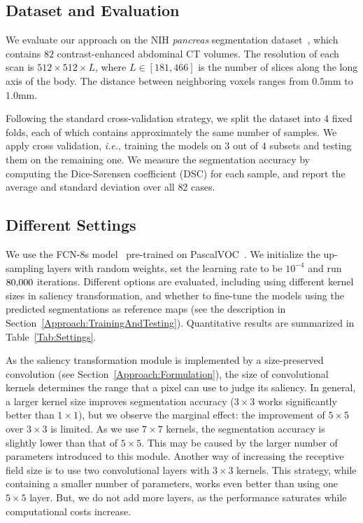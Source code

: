 \documentclass[10pt,twocolumn,letterpaper]{article}
\begin{document}
\subsection{Dataset and Evaluation}
\label{ExperimentsNIH:DatasetAndEvaluation}

We evaluate our approach on the NIH {\em pancreas} segmentation dataset~\cite{Roth_2015_DeepOrgan},
which contains $82$ contrast-enhanced abdominal CT volumes.
The resolution of each scan is $512\times512\times L$,
where ${L}\in{\left[181,466\right]}$ is the number of slices along the long axis of the body.
The distance between neighboring voxels ranges from $0.5\mathrm{mm}$ to $1.0\mathrm{mm}$.

Following the standard cross-validation strategy, we split the dataset into $4$ fixed folds,
each of which contains approximately the same number of samples.
We apply cross validation, {\em i.e.}, training the models on $3$ out of $4$ subsets and testing them on the remaining one.
We measure the segmentation accuracy by computing the Dice-S{\o}rensen coefficient (DSC) for each sample,
and report the average and standard deviation over all $82$ cases.


\subsection{Different Settings}
\label{ExperimentsNIH:Settings}

We use the FCN-8s model~\cite{Long_2015_Fully} pre-trained on PascalVOC~\cite{Everingham_2010_Pascal}.
We initialize the up-sampling layers with random weights, set the learning rate to be $10^{-4}$ and run $80\rm{,}000$ iterations.
Different options are evaluated, including using different kernel sizes in saliency transformation,
and whether to fine-tune the models using the predicted segmentations as reference maps
(see the description in Section~\ref{Approach:TrainingAndTesting}).
Quantitative results are summarized in Table~\ref{Tab:Settings}.

As the saliency transformation module is implemented by a size-preserved convolution (see Section~\ref{Approach:Formulation}),
the size of convolutional kernels determines the range that a pixel can use to judge its saliency.
In general, a larger kernel size improves segmentation accuracy ($3\times3$ works significantly better than $1\times1$),
but we observe the marginal effect: the improvement of $5\times5$ over $3\times3$ is limited.
As we use $7\times7$ kernels, the segmentation accuracy is slightly lower than that of $5\times5$.
This may be caused by the larger number of parameters introduced to this module.
Another way of increasing the receptive field size is to use two convolutional layers with $3\times3$ kernels.
This strategy, while containing a smaller number of parameters, works even better than using one $5\times5$ layer.
But, we do not add more layers, as the performance saturates while computational costs increase.
\end{document}
